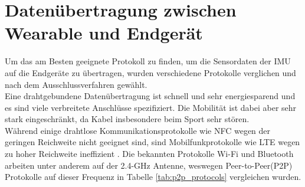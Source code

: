 \section{Datenübertragung zwischen Wearable und Endgerät}
\label{ch:bleAndMesh}
Um das am Besten geeignete Protokoll zu finden, um die Sensordaten der IMU auf die Endgeräte zu übertragen, wurden verschiedene Protokolle verglichen und nach dem Ausschlussverfahren gewählt.\\
Eine drahtgebundene Datenübertragung ist schnell und sehr energiesparend und es sind viele verbreitete Anschlüsse spezifiziert.
Die Mobilität ist dabei aber sehr stark eingeschränkt, da Kabel insbesondere beim Sport sehr stören.\\
Während einige drahtlose Kommunikationsprotokolle wie NFC wegen der geringen Reichweite nicht geeignet sind, sind Mobilfunkprotokolle wie LTE wegen zu hoher Reichweite ineffizient \cite{comparison_wifi_lte}.
Die bekannten Protokolle Wi-Fi und Bluetooth arbeiten unter anderem auf der 2.4-GHz Antenne, weswegen Peer-to-Peer(P2P) Protokolle auf dieser Frequenz in Tabelle \ref{tab:p2p_protocols} vergleichen wurden.\\
